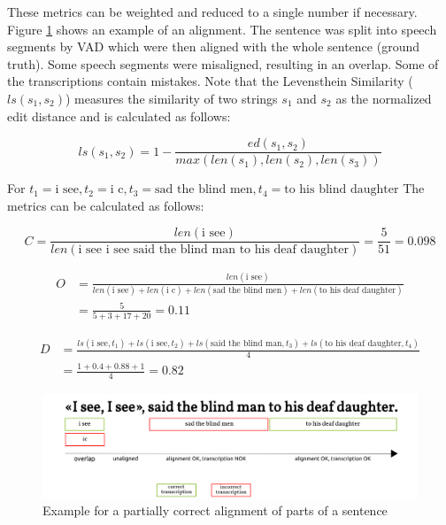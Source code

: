 These metrics can be weighted and reduced to a single number if necessary. Figure \ref{example_alignment} shows an example of an alignment. The sentence was split into speech segments by \ac{VAD} which were then aligned with the whole sentence (ground truth). Some speech segments were misaligned, resulting in an overlap. Some of the transcriptions contain mistakes. Note that the Levensthein Similarity ($ls(s_1, s_2)$) measures the similarity of two strings $s_1$ and $s_2$ as the normalized edit distance and is calculated as follows:

\begin{equation}
	ls(s_1, s_2) = 1 - \frac{ed(s_1, s_2)}{max \left(len(s_1), len(s_2), len(s_3)\right)}
\end{equation}

For $t_1=\text{i see}, t_2=\text{i c}, t_3 = \text{sad the blind men}, t_4 = \text{to his blind daughter}$ The metrics can be calculated as follows:

\begin{equation}
C = \frac{len(\text{i see})}{len(\text{i see i see said the blind man to his deaf daughter})} = \frac{5}{51} = 0.098
\end{equation}

\begin{equation}
\begin{split}
O & = \frac{len(\text{i see})}{len(\text{i see}) + len(\text{i c}) + len(\text{sad the blind men}) + len(\text{to his deaf daughter})} \\
 & = \frac{5}{5 + 3 + 17 + 20} = 0.11
\end{split}
\end{equation}

\begin{equation}
\begin{split}
D & = \frac{ls(\text{i see}, t_1) + ls(\text{i see}, t_2) + ls(\text{said the blind man}, t_3) + ls(\text{to his deaf daughter}, t_4)}{4} \\
 & = \frac{1 + 0.4 + 0.88 + 1}{4} = 0.82
\end{split}
\end{equation}

\begin{figure}
	\includegraphics[width=\linewidth]{./img/example_alignment.png}
	\caption{Example for a partially correct alignment of parts of a sentence}
	\label{example_alignment}
\end{figure}